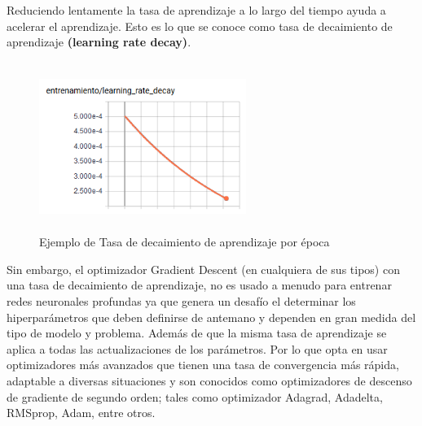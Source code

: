 		Reduciendo lentamente la tasa de aprendizaje a lo largo del tiempo ayuda a acelerar el aprendizaje. Esto es lo que se conoce como tasa de decaimiento de aprendizaje {\bf(learning rate decay)}.
			\begin{figure}[H]
				\begin{center}
				\includegraphics[width=0.6\textwidth,height=5.5cm]{images/desarrollo/entrenamiento/LR_decay} 
				\end{center}
				\begin{center}
				\caption{\small{Ejemplo de Tasa de decaimiento de aprendizaje por época  }}
				\vspace{-0.5em}
				{\small{\fontsize{10}{16.8}\selectfont {Fuente: Elaboración propia}}}
				\end{center}
				\vspace{-1.5em}
			\end{figure}
		Sin embargo, el optimizador Gradient Descent (en cualquiera de sus tipos) con una tasa de decaimiento de aprendizaje, no es usado a menudo para entrenar redes neuronales profundas ya que genera un desafío el determinar los hiperparámetros que deben definirse de antemano y dependen en gran medida del tipo de modelo y problema. Además de que la misma tasa de aprendizaje se aplica a todas las actualizaciones de los parámetros. Por lo que opta en usar optimizadores más avanzados que tienen una tasa de convergencia más rápida, adaptable a diversas situaciones y son conocidos como optimizadores de descenso de gradiente de segundo orden; tales como optimizador Adagrad, Adadelta, RMSprop, Adam, entre otros. 

